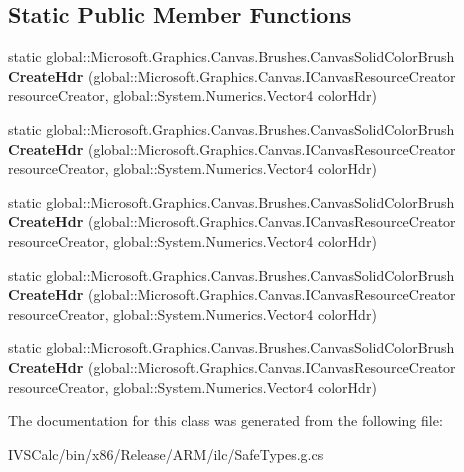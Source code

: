 \subsection*{Static Public Member Functions}
\begin{DoxyCompactItemize}
\item 
\mbox{\label{class_microsoft_1_1_graphics_1_1_canvas_1_1_brushes_1_1_canvas_solid_color_brush_aa7ae00b48941a8545508a4e0d9006143}} 
static global\+::\+Microsoft.\+Graphics.\+Canvas.\+Brushes.\+Canvas\+Solid\+Color\+Brush {\bfseries Create\+Hdr} (global\+::\+Microsoft.\+Graphics.\+Canvas.\+I\+Canvas\+Resource\+Creator resource\+Creator, global\+::\+System.\+Numerics.\+Vector4 color\+Hdr)
\item 
\mbox{\label{class_microsoft_1_1_graphics_1_1_canvas_1_1_brushes_1_1_canvas_solid_color_brush_aa7ae00b48941a8545508a4e0d9006143}} 
static global\+::\+Microsoft.\+Graphics.\+Canvas.\+Brushes.\+Canvas\+Solid\+Color\+Brush {\bfseries Create\+Hdr} (global\+::\+Microsoft.\+Graphics.\+Canvas.\+I\+Canvas\+Resource\+Creator resource\+Creator, global\+::\+System.\+Numerics.\+Vector4 color\+Hdr)
\item 
\mbox{\label{class_microsoft_1_1_graphics_1_1_canvas_1_1_brushes_1_1_canvas_solid_color_brush_aa7ae00b48941a8545508a4e0d9006143}} 
static global\+::\+Microsoft.\+Graphics.\+Canvas.\+Brushes.\+Canvas\+Solid\+Color\+Brush {\bfseries Create\+Hdr} (global\+::\+Microsoft.\+Graphics.\+Canvas.\+I\+Canvas\+Resource\+Creator resource\+Creator, global\+::\+System.\+Numerics.\+Vector4 color\+Hdr)
\item 
\mbox{\label{class_microsoft_1_1_graphics_1_1_canvas_1_1_brushes_1_1_canvas_solid_color_brush_aa7ae00b48941a8545508a4e0d9006143}} 
static global\+::\+Microsoft.\+Graphics.\+Canvas.\+Brushes.\+Canvas\+Solid\+Color\+Brush {\bfseries Create\+Hdr} (global\+::\+Microsoft.\+Graphics.\+Canvas.\+I\+Canvas\+Resource\+Creator resource\+Creator, global\+::\+System.\+Numerics.\+Vector4 color\+Hdr)
\item 
\mbox{\label{class_microsoft_1_1_graphics_1_1_canvas_1_1_brushes_1_1_canvas_solid_color_brush_aa7ae00b48941a8545508a4e0d9006143}} 
static global\+::\+Microsoft.\+Graphics.\+Canvas.\+Brushes.\+Canvas\+Solid\+Color\+Brush {\bfseries Create\+Hdr} (global\+::\+Microsoft.\+Graphics.\+Canvas.\+I\+Canvas\+Resource\+Creator resource\+Creator, global\+::\+System.\+Numerics.\+Vector4 color\+Hdr)
\end{DoxyCompactItemize}


The documentation for this class was generated from the following file\+:\begin{DoxyCompactItemize}
\item 
I\+V\+S\+Calc/bin/x86/\+Release/\+A\+R\+M/ilc/Safe\+Types.\+g.\+cs\end{DoxyCompactItemize}
